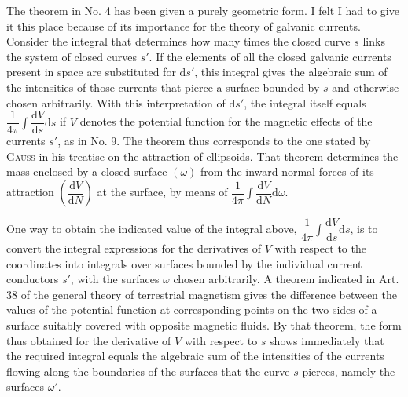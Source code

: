 The theorem in No. 4 has been given a purely geometric form. I felt I had to give it this place because of its importance for the theory of galvanic currents. Consider the integral that determines how many times the closed curve $s$ links the system of closed curves $s'$. If the elements of all the closed galvanic currents present in space are substituted for $\mathrm ds'$, this integral gives the algebraic sum of the intensities of those currents that pierce a surface bounded by $s$ and otherwise chosen arbitrarily. With this interpretation of $\mathrm ds'$, the integral itself equals $\dfrac1{4\pi}\int\dfrac{\mathrm dV}{\mathrm ds}\mathrm ds$ if $V$ denotes the potential function for the magnetic effects of the currents $s'$, as in No. 9. The theorem thus corresponds to the one stated by \textsc{Gauss} in his treatise on the attraction of ellipsoids. That theorem determines the mass enclosed by a closed surface $(\omega)$ from the inward normal forces of its attraction $\left(\dfrac{\mathrm dV}{\mathrm dN}\right)$ at the surface, by means of $\dfrac1{4\pi}\int\dfrac{\mathrm dV}{\mathrm dN}\mathrm d\omega$.

One way to obtain the indicated value of the integral above, $\dfrac1{4\pi}\allowbreak\int\dfrac{\mathrm dV}{\mathrm ds}\mathrm ds$, is to convert the integral expressions for the derivatives of $V$ with respect to the coordinates into integrals over surfaces bounded by the individual current conductors $s'$, with the surfaces $\omega$ chosen arbitrarily. A theorem indicated in Art. 38 of the general theory of terrestrial magnetism gives the difference between the values of the potential function at corresponding points on the two sides of a surface suitably covered with opposite magnetic fluids. By that theorem, the form thus obtained for the derivative of $V$ with respect to $s$ shows immediately that the required integral equals the algebraic sum of the intensities of the currents flowing along the boundaries of the surfaces that the curve $s$ pierces, namely the surfaces $\omega'$.

